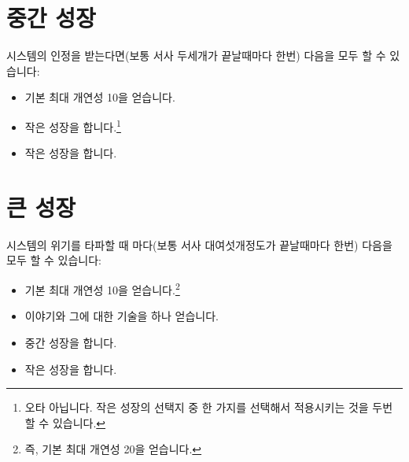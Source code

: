 \documentclass{report}
\begin{document}
	\section*{중간 성장}
	시스템의 인정을 받는다면(보통 서사 두세개가 끝날때마다 한번) 다음을 모두 할 수 있습니다:
	\begin{itemize}
		\item 기본 최대 개연성 10을 얻습니다.
		\item 작은 성장을 합니다.\footnote{\label{medium-upgrade-small-upgrade}오타 아닙니다. 작은 성장의 선택지 중 한 가지를 선택해서 적용시키는 것을 두번 할 수 있습니다.}
		\item 작은 성장을 합니다.
	\end{itemize}
	
	\section*{큰 성장}
	시스템의 위기를 타파할 때 마다(보통 서사 대여섯개정도가 끝날때마다 한번) 다음을 모두 할 수 있습니다:
	\begin{itemize}
		\item 기본 최대 개연성 10을 얻습니다.\footnote{\label{big-upgrade-cost}즉, 기본 최대 개연성 20을 얻습니다.}
		\item 이야기와 그에 대한 기술을 하나 얻습니다.
		\item 중간 성장을 합니다.
		\item 작은 성장을 합니다.
	\end{itemize}
	
\end{document}
